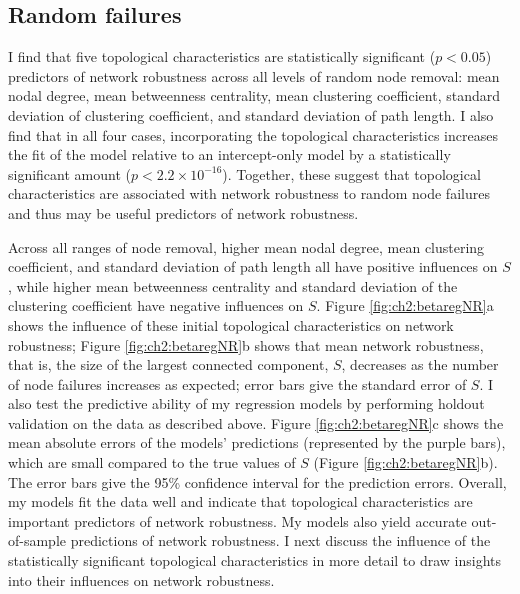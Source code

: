 
\subsection{Random failures}
\label{sec:ch2:results:random}

I find that five topological characteristics are statistically significant ($p < 0.05$) predictors of network robustness across all levels of random node removal: mean nodal degree, mean betweenness centrality, mean clustering coefficient, standard deviation of clustering coefficient, and standard deviation of path length. I also find that in all four cases, incorporating the topological characteristics increases the fit of the model relative to an intercept-only model by a statistically significant amount ($p < 2.2 \times 10^{-16}$). Together, these suggest that topological characteristics are associated with network robustness to random node failures and thus may be useful predictors of network robustness.

Across all ranges of node removal, higher mean nodal degree, mean clustering coefficient, and standard deviation of path length all have positive influences on $S$, while higher mean betweenness centrality and standard deviation of the clustering coefficient have negative influences on $S$. Figure \ref{fig:ch2:betaregNR}a shows the influence of these initial topological characteristics on network robustness; Figure \ref{fig:ch2:betaregNR}b shows that mean network robustness, that is, the size of the largest connected component, $S$, decreases as the number of node failures increases as expected; error bars give the standard error of $S$. I also test the predictive ability of my regression models by performing holdout validation on the data as described above. Figure \ref{fig:ch2:betaregNR}c shows the mean absolute errors of the models' predictions (represented by the purple bars), which are small compared to the true values of $S$ (Figure \ref{fig:ch2:betaregNR}b). The error bars give the 95\% confidence interval for the prediction errors. Overall, my models fit the data well and indicate that topological characteristics are important predictors of network robustness. My models also yield accurate out-of-sample predictions of network robustness. I next discuss the influence of the statistically significant topological characteristics in more detail to draw insights into their influences on network robustness.


